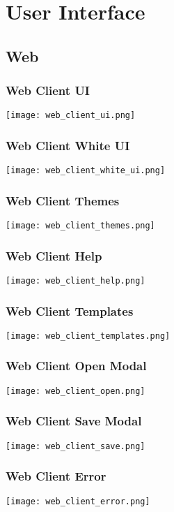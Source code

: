 \chapter{User Interface}\label{app:ui}

\section{Web}\label{app:ui_web}

\subsection{Web Client UI}\label{app:web_client_ui}
\texttt{[image: web\_client\_ui.png]}

\subsection{Web Client White UI}\label{app:web_client_white_ui}
\texttt{[image: web\_client\_white\_ui.png]}

\subsection{Web Client Themes}\label{app:web_client_themes}
\texttt{[image: web\_client\_themes.png]}

\subsection{Web Client Help}\label{app:web_client_help}
\texttt{[image: web\_client\_help.png]}

\subsection{Web Client Templates}\label{app:web_client_templates}
\texttt{[image: web\_client\_templates.png]}

\subsection{Web Client Open Modal}\label{app:web_client_open}
\texttt{[image: web\_client\_open.png]}

\subsection{Web Client Save Modal}\label{app:web_client_save}
\texttt{[image: web\_client\_save.png]}

\subsection{Web Client Error}\label{app:web_client_error}
\texttt{[image: web\_client\_error.png]}
